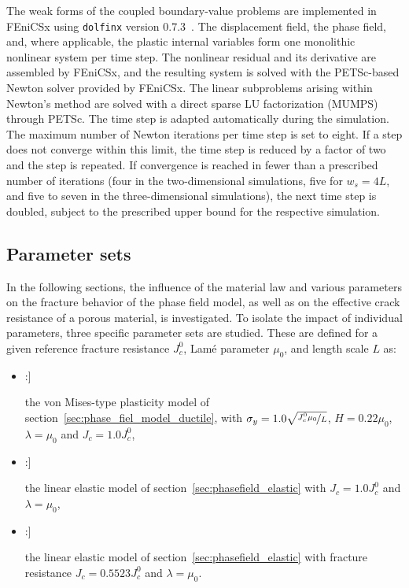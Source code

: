 \documentclass[pdflatex,sn-mathphys-num]{sn-jnl}%
\newcommand{\vMLabel}{[\textbf{vM}]\xspace}
\newcommand{\EqJcLabel}{[\textbf{Eq$\boldsymbol{J_c}$}]\xspace}
\newcommand{\EqSigmaStarLabel}{[\textbf{Eq$\boldsymbol{\sigma^*}$}]\xspace}
\theoremstyle{thmstyleone}%
\theoremstyle{thmstyletwo}%
\theoremstyle{thmstylethree}%
\begin{document}
The weak forms of the coupled boundary-value problems are implemented in FEniCSx using \texttt{dolfinx} version 0.7.3~\cite{fenicsx_documentation}. The displacement field, the phase field, and, where applicable, the plastic internal variables form one monolithic nonlinear system per time step. The nonlinear residual and its derivative are assembled by FEniCSx, and the resulting system is solved with the PETSc-based Newton solver provided by FEniCSx. The linear subproblems arising within Newton's method are solved with a direct sparse LU factorization (MUMPS) through PETSc. The time step is adapted automatically during the simulation. The maximum number of Newton iterations per time step is set to eight. If a step does not converge within this limit, the time step is reduced by a factor of two and the step is repeated. If convergence is reached in fewer than a prescribed number of iterations (four in the two-dimensional simulations, five for $w_s = 4L$, and five to seven in the three-dimensional simulations), the next time step is doubled, subject to the prescribed upper bound for the respective simulation.







\subsection{Parameter sets}
\label{sec:parameter_sets}
In the following sections, the influence of the material law and various parameters on the fracture behavior of the phase field model,
as well as on the effective crack resistance of a porous material, is investigated.
To isolate the impact of individual parameters, three specific parameter sets are studied.
These are defined for a given reference fracture resistance $J_c^0$, Lam\'{e} parameter $\mu_0$, and length scale $L$ as: 
\begin{itemize}
\setlength{\itemindent}{4em}


\item[\vMLabel:]
\parbox[t]{\dimexpr\linewidth-4em\relax}{
the von Mises-type plasticity model of section~\ref{sec:phase_fiel_model_ductile},
with $\sigma_y=1.0\sqrt{\nicefrac{J_c^0\mu_0}{L}}$, $H=0.22\mu_0$,
$\lambda=\mu_0$ and $J_c=1.0J_c^0$,
}

\item[\EqJcLabel:]
\parbox[t]{\dimexpr\linewidth-4em\relax}{
the linear elastic model of section~\ref{sec:phasefield_elastic}
with $J_c=1.0J_c^0$ and $\lambda=\mu_0$,
}

\item[\EqSigmaStarLabel:]
\parbox[t]{\dimexpr\linewidth-4em\relax}{
the linear elastic model of section~\ref{sec:phasefield_elastic}
with fracture resistance $J_c=0.5523J_c^0$ and $\lambda=\mu_0$.
}
\end{itemize}
\end{document}

